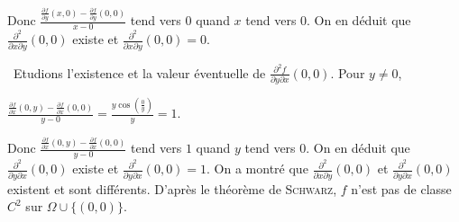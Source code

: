 {{Donc $ \frac{ \frac{\partial f}{\partial y}(x,0)- \frac{\partial f}{\partial y}(0,0)}{x-0}$ tend vers $0$ quand $x$ tend vers $0$. On en déduit que $ \frac{\partial^2}{\partial x\partial y}(0,0)$ existe et $ \frac{\partial^2}{\partial x\partial y}(0,0)=0$. 

\textbullet~Etudions l'existence et la valeur éventuelle de $ \frac{\partial^2f}{\partial y\partial x}(0,0)$. Pour $y\neq0$,

\begin{center} 
$ \frac{ \frac{\partial f}{\partial x}(0,y)- \frac{\partial f}{\partial x}(0,0)}{y-0}= \frac{y\cos\left( \frac{0}{y}\right)}{y}=1$.
\end{center}

Donc $ \frac{ \frac{\partial f}{\partial x}(0,y)- \frac{\partial f}{\partial x}(0,0)}{y-0}$ tend vers $1$ quand $y$ tend vers $0$. On en déduit que $ \frac{\partial^2}{\partial y\partial x}(0,0)$ existe et $ \frac{\partial^2}{\partial y\partial x}(0,0)=1$. On a montré que $ \frac{\partial^2}{\partial x\partial y}(0,0)$ et $ \frac{\partial^2}{\partial y\partial x}(0,0)$ existent et sont différents. D'après le théorème de \textsc{Schwarz}, $f$ n'est pas de classe $C^2$ sur $\Omega\cup\{(0,0)\}$.}
}